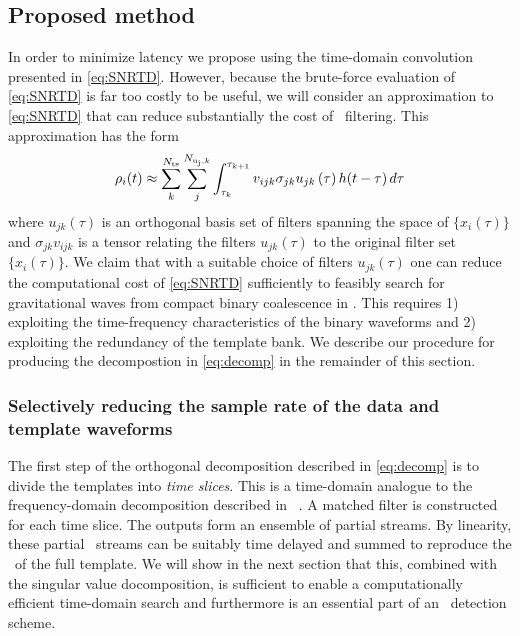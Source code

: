 \subsection{Proposed method}

In order to minimize latency we propose using the time-domain convolution
presented in \eqref{eq:SNRTD}.  However, because the brute-force evaluation of
\eqref{eq:SNRTD} is far too costly to be useful, we will consider an
approximation to \eqref{eq:SNRTD} that can reduce substantially the cost of
\realtime\ filtering. This approximation has the form
%
%
\begin{equation}
\rho_i(t) \approx \sum_k^{{N}_{\mathrm{ts}}} \sum_j^{N_{\mathrm{u_j},k}} 
	\int_{\tau_{k}}^{\tau_{k+1}} v_{ijk} \sigma_{jk} u_{jk}\,(\tau) \, h(t-\tau) \, d \tau \label{eq:decomp}
\end{equation} 
%
%
where $u_{jk}(\tau)$ is an orthogonal basis set of filters spanning the space
of $\{x_i(\tau)\}$ and $\sigma_{jk} v_{ijk}$ is a tensor relating the filters
$u_{jk}(\tau)$ to the original filter set $\{x_i(\tau)\}$.  We claim that with
a suitable choice of filters $u_{jk}(\tau)$ one can reduce the computational
cost of \eqref{eq:SNRTD} sufficiently to feasibly search for
gravitational waves from compact binary coalescence in \realtime.  This
requires 1) exploiting
the time-frequency characteristics of the binary waveforms and 2) exploiting the redundancy of the template bank. We describe our
procedure for producing the decompostion in \eqref{eq:decomp} in the remainder
of this section.

\subsubsection{Selectively reducing the sample rate of the data and template waveforms}

The first step of the orthogonal decomposition described in \eqref{eq:decomp}
is to divide the templates into \emph{time slices}.  This is a time-domain
analogue to the frequency-domain decomposition described in ~\cite{Marion2004,
Buskulic2010, beauville2006, beauville2008}.  A matched filter is constructed
for each time slice.  The outputs form an ensemble of partial \SNR{}
streams.  By linearity, these partial \SNR\ streams can be suitably time
delayed and summed to reproduce the \SNR\ of the full template.  We will show
in the next section that this, combined with the singular value docomposition,
is sufficient to enable a computationally efficient time-domain search and
furthermore is an essential part of an \earlywarning\ detection scheme.


